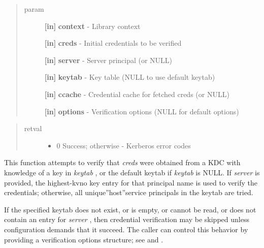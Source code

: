 \documentclass[letterpaper,10pt,english]{sphinxmanual}
\begin{document}
\begin{quote}\begin{description}
\item[{param}] \leavevmode
\textbf{{[}in{]}} \textbf{context} - Library context

\textbf{{[}in{]}} \textbf{creds} - Initial credentials to be verified

\textbf{{[}in{]}} \textbf{server} - Server principal (or NULL)

\textbf{{[}in{]}} \textbf{keytab} - Key table (NULL to use default keytab)

\textbf{{[}in{]}} \textbf{ccache} - Credential cache for fetched creds (or NULL)

\textbf{{[}in{]}} \textbf{options} - Verification options (NULL for default options)

\end{description}\end{quote}
\begin{quote}\begin{description}
\item[{retval}] \leavevmode\begin{itemize}
\item {} 
0   Success; otherwise - Kerberos error codes

\end{itemize}

\end{description}\end{quote}

This function attempts to verify that \emph{creds} were obtained from a KDC with knowledge of a key in \emph{keytab} , or the default keytab if \emph{keytab} is NULL. If \emph{server} is provided, the highest-kvno key entry for that principal name is used to verify the credentials; otherwise, all unique''host''service principals in the keytab are tried.

If the specified keytab does not exist, or is empty, or cannot be read, or does not contain an entry for \emph{server} , then credential verification may be skipped unless configuration demands that it succeed. The caller can control this behavior by providing a verification options structure; see {\hyperref[appdev/refs/api/krb5_verify_init_creds_opt_init:c.krb5_verify_init_creds_opt_init]{}} and {\hyperref[appdev/refs/api/krb5_verify_init_creds_opt_set_ap_req_nofail:c.krb5_verify_init_creds_opt_set_ap_req_nofail]{}} .
\end{document}
